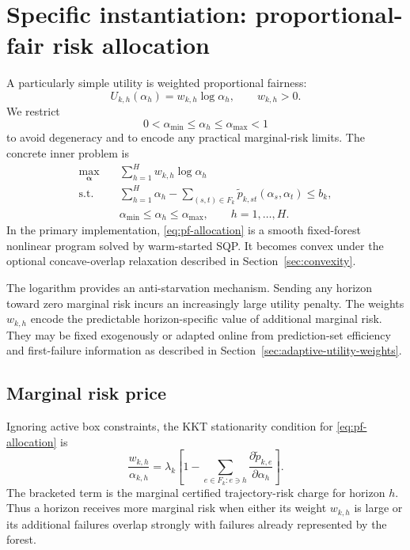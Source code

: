 \documentclass[11pt]{article}
\begin{document}
\section{Specific instantiation: proportional-fair risk allocation}
\label{sec:pf}

A particularly simple utility is weighted proportional fairness:
\begin{equation}
    U_{k,h}(\alpha_h)
    =
    w_{k,h}\log \alpha_h,
    \qquad
    w_{k,h}>0.
    \label{eq:log-utility}
\end{equation}
We restrict
\[
    0<\alpha_{\min}\le\alpha_h\le\alpha_{\max}<1
\]
to avoid degeneracy and to encode any practical marginal-risk limits. The concrete inner problem is
\begin{equation}
\boxed{
\begin{aligned}
    \max_{\bm\alpha}\quad
        & \sum_{h=1}^H w_{k,h}\log\alpha_h\\
    \text{s.t.}\quad
        & \sum_{h=1}^H\alpha_h
        -\sum_{(s,t)\in F_k}
        \widetilde p_{k,st}(\alpha_s,\alpha_t)
        \le b_k,\\
        & \alpha_{\min}\le\alpha_h\le\alpha_{\max},
        \qquad h=1,\ldots,H.
\end{aligned}}
\label{eq:pf-allocation}
\end{equation}
In the primary implementation, \eqref{eq:pf-allocation} is a smooth fixed-forest nonlinear program solved by warm-started SQP.  It becomes convex under the optional concave-overlap relaxation described in Section~\ref{sec:convexity}.

The logarithm provides an anti-starvation mechanism. Sending any horizon toward zero marginal risk incurs an increasingly large utility penalty. The weights $w_{k,h}$ encode the predictable horizon-specific value of additional marginal risk.  They may be fixed exogenously or adapted online from prediction-set efficiency and first-failure information as described in Section~\ref{sec:adaptive-utility-weights}.
\subsection{Marginal risk price}

Ignoring active box constraints, the KKT stationarity condition for \eqref{eq:pf-allocation} is
\begin{equation}
    \frac{w_{k,h}}{\alpha_{k,h}}
    =
    \lambda_k
    \left[
        1-
        \sum_{e\in F_k:e\ni h}
        \frac{\partial\widetilde p_{k,e}}{\partial\alpha_h}
    \right].
    \label{eq:pf-kkt}
\end{equation}
The bracketed term is the marginal certified trajectory-risk charge for horizon $h$. Thus a horizon receives more marginal risk when either its weight $w_{k,h}$ is large or its additional failures overlap strongly with failures already represented by the forest.
\end{document}
